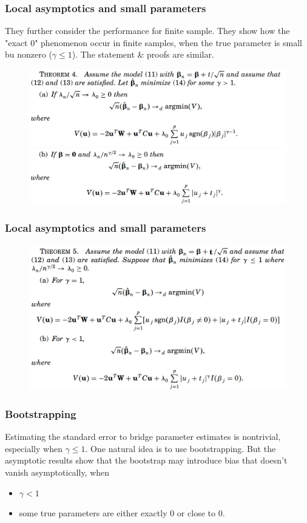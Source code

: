 \documentclass{beamer}
\begin{document}
	\begin{frame}
		\frametitle{Local asymptotics and small parameters}
		They further consider the performance for finite sample. They show how the "exact 0" phenomenon occur in finite samples, when the true parameter is small bu nonzero ($\gamma \leq 1$). The statement \& proofs are similar.
		\begin{figure}
			\includegraphics[width=.8\linewidth]{image011.png}
			\includegraphics[width=.8\linewidth]{image012.png}
		\end{figure}
	\end{frame}
	
	\begin{frame}
		\frametitle{Local asymptotics and small parameters}
		\begin{figure}
			\includegraphics[width=1\linewidth]{image013.png}
		\end{figure}
	\end{frame}
	
	\begin{frame}
		\frametitle{Bootstrapping}
		Estimating the standard error to bridge parameter estimates is nontrivial, especially when $\gamma \leq 1$.
		\vspace{\baselineskip}
		One natural idea is to use bootstrapping. But the asymptotic results show that the bootstrap may introduce bias that doesn't vanish asymptotically, when
		\begin{itemize}
			\item 
			$\gamma < 1$ 
			\item
			some true parameters are either exactly 0 or close to 0.
		\end{itemize}
	\end{frame}
	
\end{document}
